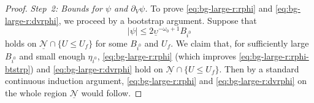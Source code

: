 \documentclass[10pt, reqno]{amsart}
\theoremstyle{definition}
\theoremstyle{remark}
\theoremstyle{conjecture}
\numberwithin{equation}{section}
\newcommand{\abs}[1]{\vert#1\vert}
\newcommand{\set}[1]{\{#1\}}
\newcommand{\rd}{\partial}
\newcommand{\0}{\emptyset}
\newcommand{\omg}{\omega}
\newcommand{\ups}{\upsilon}
\newcommand{\calN}{\mathcal N}
\newcommand{\pfstep}[1]{\vspace{.5em} {\it \noindent #1.}}
\begin{document}
\begin{proof}
\pfstep{Step~2: Bounds for $\psi$ and $\rd_{V} \psi$}
To prove \eqref{eq:bg-large-r:rphi} and \eqref{eq:bg-large-r:dvrphi}, we proceed by a bootstrap argument. Suppose that 
\begin{equation} \label{eq:bg-large-r:rphi-btstrp}
	\abs{\psi} \leq 2 \underline{\ups}^{-\omg_{0}+1} B_{i^{0}} 
\end{equation}
holds on $\underline{\calN} \cap \set{U \leq U_{f}}$ for some $B_{i^{0}}$ and $U_{f}$. We claim that, for sufficiently large $B_{i^{0}}$ and small enough $\eta_{i^{0}}$, \eqref{eq:bg-large-r:rphi} (which improves \eqref{eq:bg-large-r:rphi-btstrp}) and \eqref{eq:bg-large-r:dvrphi} hold on $\underline{\calN} \cap \set{U \leq U_{f}}$. Then by a standard continuous induction argument,  \eqref{eq:bg-large-r:rphi} and \eqref{eq:bg-large-r:dvrphi} on the whole region $\underline{\calN}$ would follow.


\end{proof}
\end{document}
